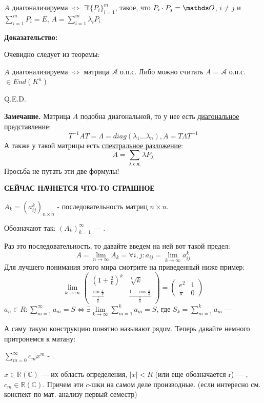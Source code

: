 $A$ диагонализируема $\Leftrightarrow$ $\exists! \{P_i\}_{i=1}^m$, такое, что  $P_i \cdot P_j = \zero$, $i\neq j$
и $\sum\limits_{i=1}^m P_i=E$,
$A = \sum\limits_{i=1}^m\lambda_iP_i$

\textbf{Доказательство:} 

Очевидно следует из теоремы: 

$A$ диагонализируема $\iff$ матрица $\mathcal{A}$ о.п.с. Либо можно считать  $A=\mathcal{A}$ о.п.с. 	$\in End (K^n)$

  \hfill Q.E.D.

\textbf{Замечание.} Матрица $A$ подобна диагональной, то у нее есть \uline{диагональное представление}:
$$T^{-1}AT = \Lambda = diag (\lambda_1 \dots \lambda_n), A = T \Lambda T^{-1}$$
А также у такой матрицы есть \uline{спектральное разложение}:
$$A=\sum\limits_{\lambda  \text{ c.ч.}}\lambda P_{\lambda}$$
Просьба не путать эти две формулы!

\textbf{СЕЙЧАС НАЧНЕТСЯ ЧТО-ТО СТРАШНОЕ}

 $A_k = (a_{ij}^k)_{n\times n}$ - последовательность матриц $n\times n$.

Обозначают так: $(A_k)_{k=1}^{\infty}$  --- .

Раз это последовательность, то давайте введем на ней вот такой предел:
$$A = \lim\limits_{n\rightarrow \infty} A_k = \forall i,j: a_{ij}=\lim\limits_{k\rightarrow \infty}a_{ij}^k$$
Для лучшего понимания этого мира смотрите на приведенный ниже пример:
$$\lim\limits_{k\rightarrow \infty}\left(
 \begin{matrix}
 (1+ \frac{2}{k})^k & \sqrt[k]{k} \\
 \frac{\sin \frac{\pi}k}{\frac1k} & \frac{1 - \cos \frac{\pi}k}{\frac{1}{k}}
 \end{matrix}
\right) = \left(
 \begin{matrix}
 e^2 & 1 \\
 \pi & 0
 \end{matrix}
\right)$$
 $a_n \in R: \sum\limits_{m=1}^{\infty}a_m = S \Leftrightarrow
\exists \lim\limits_{k \rightarrow \infty}\sum\limits_{m=1}^k a_m=S$, где $S_k =\sum\limits_{m=1}^k a_m $ --- 

А саму такую конструкцию понятно называют рядом. Теперь давайте немного притронемся к матану:

$\sum\limits_{m=0}^\infty c_mx^m$ - . 

$x\in \mathbb{R}(\mathbb{C})$ --- их область определения, $|x| < R$ (или еще обозначается r) --- , $c_m \in \mathbb{R}(\mathbb{C})$. Причем эти $c$-шки на самом деле производные. (если интересно см. конспект по мат. анализу первый семестр)

